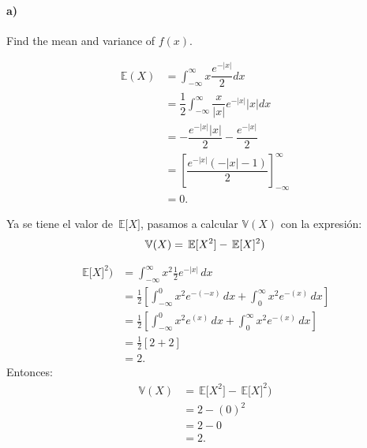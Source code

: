 \documentclass{article}
\newcommand\espe[1]{\, \mathbb{E} \lbrack #1 \rbrack}
\begin{document}
\paragraph{a)}Find the mean and variance of $f(x)$.

				\begin{align}
				   	\mathbb{E}(X)  & = \int_{-\infty}^{\infty}x\dfrac{e^{-|x|}}{2} dx \\
				& = \dfrac{1}{2}\int_{-\infty}^{\infty}  \dfrac{x}{|x|} e^{-|x|} |x| dx\\
				& = - \dfrac{e^{-|x|} |x|}{2} - \dfrac{e^{-|x|}}{2}\\
				& = \left[ \dfrac{e^{-|x|} (-|x|-1)}{2}\right] _{-\infty}^{\infty}\\
				& = 0. 
				\end{align}
				
				Ya se tiene el valor de $\espe{X}$, pasamos a calcular $\mathbb{V}(X)$ con la expresión:
				\begin{equation}
				    	\mathbb{V}(X) = \espe{X^{2}} - \espe{X}^{2})\\
				\end{equation}
		
			\begin{align}
			   \espe{X}^{2}) & =  \int_{-\infty}^{\infty} x^2 \frac{1}{2}e^{-|x|} \, dx \\ 
                    & = \frac{1}{2} \left[\int_{-\infty}^{0} x^2 e^{-(-x)} \, dx + \int_{0}^{\infty} x^2 e^{-(x)} \, dx \right] \\ 
                    & = \frac{1}{2} \left[\int_{-\infty}^{0} x^2 e^{(x)} \, dx + \int_{0}^{\infty} x^2 e^{-(x)} \, dx \right] \\ \nonumber
                    & = \frac{1}{2} \left[2+2 \right] \\ 
                    & = 2. 
			\end{align}
		Entonces: 
		 \begin{align}
      \mathbb{V}(X)  & = \espe{X^{2}} - \espe{X}^{2})\\
        & = 2 - (0)^2 \\ 
                & = 2 - 0 \\
                & = 2. 
    \end{align}
   
\newpage


\end{document}
